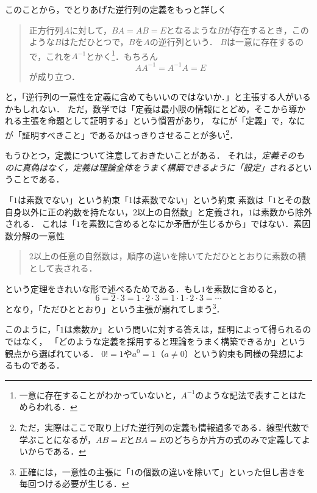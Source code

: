 このことから，でとりあげた逆行列の定義をもっと詳しく

\begin{quote}
  正方行列$A$に対して，$BA = AB =E$となるような$B$が存在するとき，このような$B$はただひとつで，$B$を$A$の逆行列という．
  $B$は一意に存在するので，これを$A^{-1}$とかく\footnote{一意に存在することがわかっていないと，$A^{-1}$のような記法で表すことはためらわれる．}．もちろん
  \[
    AA^{-1}=A^{-1}A=E
  \]
  が成り立つ．
\end{quote}
と，「逆行列の一意性を定義に含めてもいいのではないか．」と主張する人がいるかもしれない．
ただ，数学では「定義は最小限の情報にとどめ，そこから導かれる主張を命題として証明する」という慣習があり，
なにが「定義」で，なにが「証明すべきこと」であるかはっきりさせることが多い\footnote{ただ，実際はここで取り上げた逆行列の定義も情報過多である．線型代数で学ぶことになるが，$AB=E$と$BA=E$のどちらか片方の式のみで定義してよいからである．}．

もうひとつ，定義について注意しておきたいことがある．
それは，\emph{定義そのものに真偽はなく，定義は理論全体をうまく構築できるように「設定」される}ということである．
 
\begin{example}{「$1$は素数でない」という約束}{「1は素数でない」という約束}
  素数は「$1$とその数自身以外に正の約数を持たない，$2$以上の自然数」と定義され，$1$は素数から除外される．
  これは「$1$を素数に含めるとなにか矛盾が生じるから」ではない．素因数分解の一意性
  \begin{quote}
    $2$以上の任意の自然数は，順序の違いを除いてただひととおりに素数の積として表される．
  \end{quote}
  という定理をきれいな形で述べるためである．もし$1$を素数に含めると，
  \[
    6 = 2 \cdot 3 = 1 \cdot 2 \cdot 3 = 1 \cdot 1 \cdot 2 \cdot 3 = \cdots
  \]
  となり，「ただひととおり」という主張が崩れてしまう\footnote{正確には，一意性の主張に「$1$の個数の違いを除いて」といった但し書きを毎回つける必要が生じる．}．
\end{example}

このように，「$1$は素数か」という問いに対する答えは，証明によって得られるのではなく，
「どのような定義を採用すると理論をうまく構築できるか」という観点から選ばれている．
$0! = 1$や$a^0 = 1$（$a \ne 0$）という約束も同様の発想によるものである．


